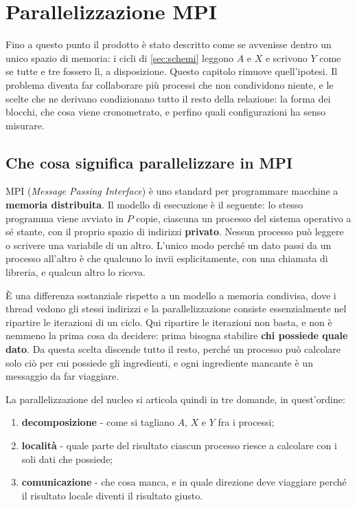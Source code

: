 \chapter{Parallelizzazione MPI}\label{cap:mpi}

Fino a questo punto il prodotto è stato descritto come se avvenisse dentro un
unico spazio di memoria: i cicli di \cref{sec:schemi} leggono $A$ e $X$ e
scrivono $Y$ come se tutte e tre fossero lì, a disposizione. Questo capitolo
rimuove quell'ipotesi. Il problema diventa far collaborare più processi che
non condividono niente, e le scelte che ne derivano condizionano tutto il
resto della relazione: la forma dei blocchi, che cosa viene cronometrato, e
perfino quali configurazioni ha senso misurare.

\section{Che cosa significa parallelizzare in MPI}\label{sec:mpi-intro}

MPI (\emph{Message Passing Interface}) è uno standard per programmare macchine
a \textbf{memoria distribuita}. Il modello di esecuzione è il seguente: lo
stesso programma viene avviato in $P$ copie, ciascuna un processo del sistema
operativo a sé stante, con il proprio spazio di indirizzi \textbf{privato}.
Nessun processo può leggere o scrivere una variabile di un altro. L'unico modo
perché un dato passi da un processo all'altro è che qualcuno lo invii
esplicitamente, con una chiamata di libreria, e qualcun altro lo riceva.

È una differenza sostanziale rispetto a un modello a memoria condivisa, dove i
thread vedono gli stessi indirizzi e la parallelizzazione consiste
essenzialmente nel ripartire le iterazioni di un ciclo. Qui ripartire le
iterazioni non basta, e non è nemmeno la prima cosa da decidere: prima bisogna
stabilire \textbf{chi possiede quale dato}. Da questa scelta discende tutto il
resto, perché un processo può calcolare solo ciò per cui possiede gli
ingredienti, e ogni ingrediente mancante è un messaggio da far viaggiare.

La parallelizzazione del nucleo si articola quindi in tre domande, in
quest'ordine:

\begin{enumerate}[nosep,left=0pt]
  \item \textbf{decomposizione} - come si tagliano $A$, $X$ e $Y$ fra i
        processi;
  \item \textbf{località} - quale parte del risultato ciascun processo riesce
        a calcolare con i soli dati che possiede;
  \item \textbf{comunicazione} - che cosa manca, e in quale direzione deve
        viaggiare perché il risultato locale diventi il risultato giusto.
\end{enumerate}

